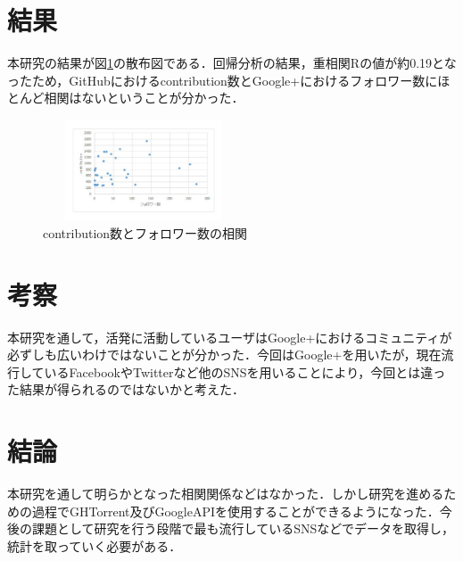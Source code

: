 \documentclass[uplatex,twocolumn,dvipdfmx]{jsarticle}
\begin{document}
\section{結果}

本研究の結果が図\ref{サンプル図}の散布図である．回帰分析の結果，重相関Rの値が約0.19となったため，GitHubにおけるcontribution数とGoogle+におけるフォロワー数にほとんど相関はないということが分かった．

\begin{figure}[ht]
\centering
\includegraphics[width=6cm,height=3cm,clip]{figure.pdf}
\caption{contribution数とフォロワー数の相関}
\label{サンプル図}
\end{figure}

\section{考察}

本研究を通して，活発に活動しているユーザはGoogle+におけるコミュニティが必ずしも広いわけではないことが分かった．今回はGoogle+を用いたが，現在流行しているFacebookやTwitterなど他のSNSを用いることにより，今回とは違った結果が得られるのではないかと考えた．

\section{結論}

本研究を通して明らかとなった相関関係などはなかった．しかし研究を進めるための過程でGHTorrent及びGoogleAPIを使用することができるようになった．今後の課題として研究を行う段階で最も流行しているSNSなどでデータを取得し，統計を取っていく必要がある．



\end{document}

